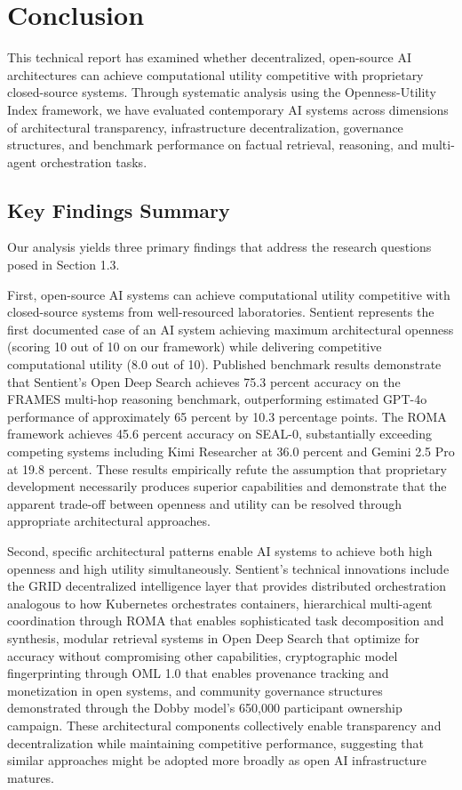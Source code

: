 \section{Conclusion}

This technical report has examined whether decentralized, open-source AI architectures can achieve computational utility competitive with proprietary closed-source systems. Through systematic analysis using the Openness-Utility Index framework, we have evaluated contemporary AI systems across dimensions of architectural transparency, infrastructure decentralization, governance structures, and benchmark performance on factual retrieval, reasoning, and multi-agent orchestration tasks.

\subsection{Key Findings Summary}

Our analysis yields three primary findings that address the research questions posed in Section 1.3.

First, open-source AI systems can achieve computational utility competitive with closed-source systems from well-resourced laboratories. Sentient represents the first documented case of an AI system achieving maximum architectural openness (scoring 10 out of 10 on our framework) while delivering competitive computational utility (8.0 out of 10). Published benchmark results demonstrate that Sentient's Open Deep Search achieves 75.3 percent accuracy on the FRAMES multi-hop reasoning benchmark, outperforming estimated GPT-4o performance of approximately 65 percent by 10.3 percentage points. The ROMA framework achieves 45.6 percent accuracy on SEAL-0, substantially exceeding competing systems including Kimi Researcher at 36.0 percent and Gemini 2.5 Pro at 19.8 percent. These results empirically refute the assumption that proprietary development necessarily produces superior capabilities and demonstrate that the apparent trade-off between openness and utility can be resolved through appropriate architectural approaches.

Second, specific architectural patterns enable AI systems to achieve both high openness and high utility simultaneously. Sentient's technical innovations include the GRID decentralized intelligence layer that provides distributed orchestration analogous to how Kubernetes orchestrates containers, hierarchical multi-agent coordination through ROMA that enables sophisticated task decomposition and synthesis, modular retrieval systems in Open Deep Search that optimize for accuracy without compromising other capabilities, cryptographic model fingerprinting through OML 1.0 that enables provenance tracking and monetization in open systems, and community governance structures demonstrated through the Dobby model's 650,000 participant ownership campaign. These architectural components collectively enable transparency and decentralization while maintaining competitive performance, suggesting that similar approaches might be adopted more broadly as open AI infrastructure matures.

